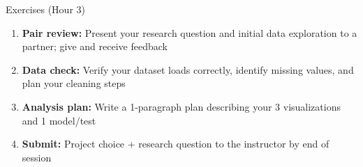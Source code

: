\documentclass[aspectratio=169,11pt]{beamer}
\begin{document}
\begin{frame}{Exercises (Hour 3)}
\begin{enumerate}
  \item \textbf{Pair review:} Present your research question and initial data exploration to a partner; give and receive feedback
  \item \textbf{Data check:} Verify your dataset loads correctly, identify missing values, and plan your cleaning steps
  \item \textbf{Analysis plan:} Write a 1-paragraph plan describing your 3 visualizations and 1 model/test
  \item \textbf{Submit:} Project choice + research question to the instructor by end of session
\end{enumerate}
\end{frame}
\end{document}
